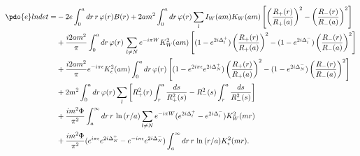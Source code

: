 \begin{equation}
\label{Eq_0226}
\begin{split}
\pdo{e}lndet
  =& -2 e \int^a_0 dr \, r \, \varphi(r) B(r)
  + 2am^2 \int^a_0 dr \, \varphi(r) \sum_l I_W(am) K_W(am)
  \left[
  \left(\frac{R_{+}(r)}{R_{+}(a)}\right)^2 
  - \left(\frac{R_{-}(r)}{R_{-}(a)}\right)^2
  \right]\\
  &+ \frac{i2am^2}{\pi} \int^a_0 dr \, \varphi(r) \,
  \sum_{l \neq N} e^{-i \pi W} K^2_W(am)
  \left[
  (1 - e^{2i\Delta^{+}_l}) \left(\frac{R_{+}(r)}{R_{+}(a)}\right)^2
  - (1 - e^{2i\Delta^{-}_l}) \left(\frac{R_{-}(r)}{R_{-}(a)}\right)^2
  \right]\\
  &+ \frac{i2am^2}{\pi} e^{-i \pi \epsilon} K^2_{\epsilon}(am)
  \int^a_0 dr \, \varphi(r)
  \left[
  (1 - e^{2i\pi\epsilon} e^{2i\Delta^{+}_N})\left(\frac{R_{+}(r)}{R_{+}(a)}\right)^2
  - (1 - e^{2i\Delta^{-}_N})\left(\frac{R_{-}(r)}{R_{-}(a)}\right)^2
  \right]\\
  &+ 2 m^2 \int^a_0 dr \, \varphi(r)
  \sum_l
  \left[
  R^2_{+}(r) \int^a_r \frac{ds}{R^2_{+}(s)}
  - R^2_{-}(s) \int^a_r \frac{ds}{R^2_{-}(s)}
  \right]\\
  &+ \frac{i m^2 \Phi}{\pi^2} \int^{\infty}_a dr \, r \,
  \ln \, (r/a)
  \sum_{l \neq N}
  e^{-i\pi W}(e^{2i\Delta^{+}_l} - e^{2i \Delta^{-}_l})
  K^2_W(mr)\\
  &+ \frac{im^2 \Phi}{\pi^2} (e^{i\pi\epsilon}
  e^{2i\Delta^{+}_N} - e^{- i\pi\epsilon}e^{2i\Delta^{-}_N})
  \int^{\infty}_a dr \, r \,
  \ln \, (r/a) K^2_{\epsilon}(mr).
\end{split}
\end{equation}

